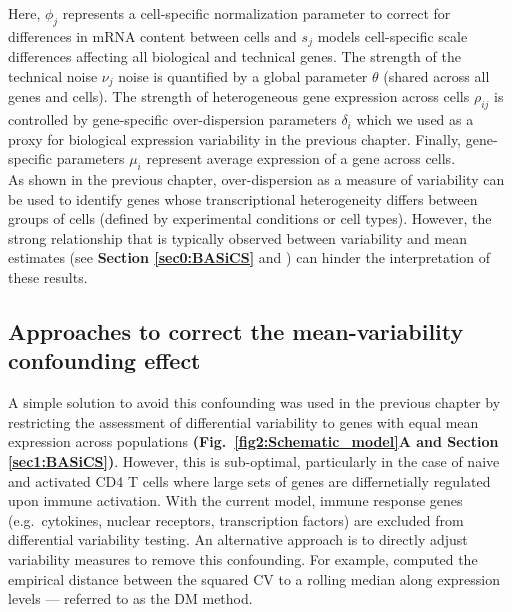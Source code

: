 Here, $\phi_j$ represents a cell-specific normalization parameter to correct for differences in mRNA content between cells and $s_j$ models cell-specific scale differences affecting all biological and technical genes. The strength of the technical noise $\nu_j$ noise is quantified by a global parameter $\theta$ (shared across all genes and cells). The strength of heterogeneous gene expression across cells $\rho_{ij}$ is controlled by gene-specific over-dispersion parameters $\delta_i$ which we used as a proxy for biological expression variability in the previous chapter.  Finally, gene-specific parameters $\mu_i$ represent average expression of a gene across cells. \\

As shown in the previous chapter, over-dispersion as a measure of variability can be used to identify genes whose transcriptional heterogeneity differs between groups of cells (defined by experimental conditions or cell types). However, the strong relationship that is typically observed between variability and mean estimates (see \textbf{Section \ref{sec0:BASiCS}} and \citep{Brennecke2013}) can hinder the interpretation of these results. 

\newpage

\subsection{Approaches to correct the mean-variability confounding effect}

A simple solution to avoid this confounding was used in the previous chapter by restricting the assessment of differential variability to genes with equal mean expression across populations \textbf{(Fig.~\ref{fig2:Schematic_model}A and Section \ref{sec1:BASiCS})}. However, this is sub-optimal, particularly in the case of naive and activated CD4\plus{} T cells where large sets of genes are differnetially regulated upon immune activation. With the current model, immune response genes (e.g.~cytokines, nuclear receptors, transcription factors) are excluded from differential variability testing. An alternative approach is to directly adjust variability measures to remove this confounding. For example, \cite{Kolodziejczyk2015cell} computed the empirical distance between the squared CV to a rolling median along expression levels --- referred to as the DM method.  \\

